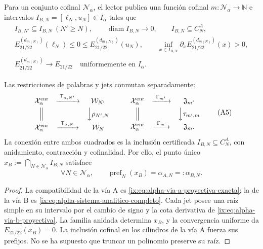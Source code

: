 Para un conjunto cofinal \(\mathcal N_\alpha\), el lector publica una función
cofinal \(m:\mathcal N_\alpha\to\mathbb N\) e intervalos
\(I_{B,N}=[\ell_N,u_N]\Subset I_\alpha\) tales que
\begin{equation}
\begin{gathered}
 I_{B,N'}\subseteq I_{B,N}\ (N'\ge N),\qquad
 \operatorname{diam}I_{B,N}\longrightarrow0,\qquad
 I_{B,N}\subseteq C_N^A,\\
 E_{21/22}^{(d_{m(N)})}(\ell_N)\le0\le
 E_{21/22}^{(d_{m(N)})}(u_N),\qquad
 \inf_{x\in I_{B,N}}\partial_xE_{21/22}^{(d_{m(N)})}(x)>0,\\
 E_{21/22}^{(d_{m(N)})}\longrightarrow E_{21/22}
 \quad\text{uniformemente en }I_\alpha .
\end{gathered}
 \tag{A4}
 \label{ix:eq:alpha-via-b-proyectiva}
\end{equation}

\begin{proposition}
\label{ix:prop:alpha-cuadrados-compatibilidad}
Las restricciones de palabras y jets conmutan separadamente:
\[
\begin{array}{ccc}
 \mathcal X_\alpha^{\mathrm{enr}}&
 \xrightarrow{\ \mathsf T_{\alpha,N'}\ }&\mathcal W_{N'}\\[1mm]
 \Big\Vert&&\Big\downarrow\rho_{N',N}\\[1mm]
 \mathcal X_\alpha^{\mathrm{enr}}&
 \xrightarrow{\ \mathsf T_{\alpha,N}\ }&\mathcal W_N
\end{array}
\qquad
\begin{array}{ccc}
 \mathcal X_\alpha^{\mathrm{enr}}&
 \xrightarrow{\ \Gamma_{m'}\ }&\mathfrak J_{m'}\\[1mm]
 \Big\Vert&&\Big\downarrow\tau_{m',m}\\[1mm]
 \mathcal X_\alpha^{\mathrm{enr}}&
 \xrightarrow{\ \Gamma_m\ }&\mathfrak J_m .
\end{array}
 \tag{A5}
\]
La conexión entre ambos cuadrados es la inclusión certificada
\(I_{B,N}\subseteq C_N^A\), con anidamiento, contracción y cofinalidad. Por
ello, el punto único
\(x_B:=\bigcap_{N\in\mathcal N_\alpha}I_{B,N}\) satisface
\begin{equation}
 \forall N\in\mathcal N_\alpha,\qquad
 \operatorname{pref}_N(x_B)=\alpha_{A,N}=:\alpha_{B,N}.
 \tag{A6}
 \label{ix:eq:alpha-igualdad-cada-nivel}
\end{equation}
\end{proposition}

\begin{proof}
La compatibilidad de la vía A es
\eqref{ix:eq:alpha-via-a-proyectiva-exacta}; la de la vía B es
\eqref{ix:eq:alpha-sistema-analitico-completo}. Cada jet posee una raíz simple
en su intervalo por el cambio de signo y la cota derivativa de
\eqref{ix:eq:alpha-via-b-proyectiva}. La familia anidada determina \(x_B\), y la
convergencia uniforme da \(E_{21/22}(x_B)=0\). La inclusión cofinal en los
cilindros de la vía A fuerza sus prefijos. No se ha supuesto que truncar un
polinomio preserve su raíz.
\end{proof}

